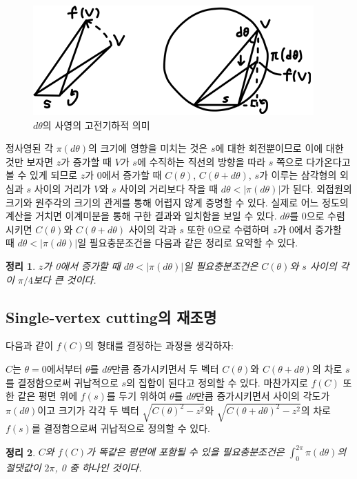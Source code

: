 \documentclass[11pt]{article}
\newtheorem{theorem}{정리}
\begin{document}
\begin{figure}
\centering
\includegraphics{7.png}
\caption{$d\theta$의 사영의 고전기하적 의미}
\end{figure}


정사영된 각 $\pi (d \theta)$의 크기에 영향을 미치는 것은 $s$에 대한 회전뿐이므로 이에 대한 것만 보자면 $z$가 증가할 때 $V$가 $s$에 수직하는 직선의 방향을 따라 $s$ 쪽으로 다가온다고 볼 수 있게 되므로 $z$가 0에서 증가할 때 $C(\theta)$, $C(\theta+d\theta)$, $s$가 이루는 삼각형의 외심과 $s$ 사이의 거리가 $V$와 $s$ 사이의 거리보다 작을 때 $d\theta <|\pi(d\theta)|$가 된다. 외접원의 크기와 원주각의 크기의 관계를 통해 어렵지 않게 증명할 수 있다. 실제로 어느 정도의 계산을 거치면 이계미분을 통해 구한 결과와 일치함을 보일 수 있다. $d\theta$를 0으로 수렴시키면 $C(\theta)$와 $C(\theta+d\theta)$ 사이의 각과 $s$ 또한 0으로 수렴하며 $z$가 0에서 증가할 때 $d\theta <|\pi(d\theta)|$일 필요충분조건을 다음과 같은 정리로 요약할 수 있다.

\begin{theorem}
$z$가 0에서 증가할 때 $d\theta <|\pi(d\theta)|$일 필요충분조건은 $C(\theta)$와 $s$ 사이의 각이 $\pi /4$보다 큰 것이다.
\end{theorem}


\subsection{Single-vertex cutting의 재조명}

다음과 같이 $f(C)$의 형태를 결정하는 과정을 생각하자:

$C$는 $\theta=0$에서부터 $\theta$를 $d\theta$만큼 증가시키면서 두 벡터 $C(\theta)$와 $C(\theta+d\theta)$의 차로 $s$를 결정함으로써 귀납적으로 $s$의 집합이 된다고 정의할 수 있다. 마찬가지로 $f(C)$ 또한 같은 평면 위에 $f(s)$를 두기 위하여 $\theta$를 $d\theta$만큼 증가시키면서 사이의 각도가 $\pi(d\theta)$이고 크기가 각각 두 벡터 $\sqrt{C(\theta)^2 -z^2 }$와 $\sqrt{C(\theta+d\theta)^2 -z^2 }$의 차로 $f(s)$를 결정함으로써 귀납적으로 정의할 수 있다.


\begin{theorem}
$C$와 $f(C)$가 똑같은 평면에 포함될 수 있을 필요충분조건은 $\int_0^{2\pi} \pi(d\theta)$의 절댓값이 $2\pi$, 0 중 하나인 것이다.
\end{theorem}
\end{document}
